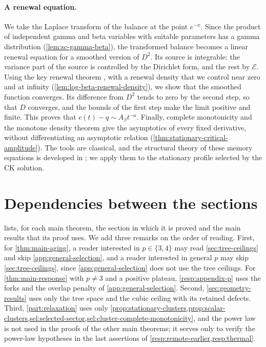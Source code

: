 \paragraph{A renewal equation.}
We take the Laplace transform of the balance at the point $e^{-x}$. Since the product of independent gamma and beta variables with suitable parameters has a gamma distribution (\cref{lem:sc-gamma-beta}), the transformed balance becomes a linear renewal equation for a smoothed version of $D^2$. Its source is integrable: the variance part of the source is controlled by the Dirichlet form, and the rest by $\mathcal E$. Using the key renewal theorem \cite[Chapter~XI, Section~1]{feller1971}, with a renewal density that we control near zero and at infinity (\cref{lem:log-beta-renewal-density}), we show that the smoothed function converges. Its difference from $D^2$ tends to zero by the second step, so that $D$ converges, and the bounds of the first step make the limit positive and finite. This proves that $c(t)-q\sim A_\beta t^{-a}$. Finally, complete monotonicity and the monotone density theorem \cite[Section~1.7.3]{bgt1987} give the asymptotics of every fixed derivative, without differentiating an asymptotic relation (\cref{thm:stationary-critical-amplitude}). The tools are classical, and the structural theory of these memory equations is developed in \cite{gs1995,fv2002,sjogren2003}; we apply them to the stationary profile selected by the CK solution.

\section{Dependencies between the sections}\label{sec:overview-dependencies}

 lists, for each main theorem, the section in which it is proved and the main results that its proof uses. We add three remarks on the order of reading. First, for \cref{thm:main-aging}, a reader interested in $p\in\{3,4\}$ may read \cref{sec:tree-ceilings} and skip \cref{app:general-selection}, and a reader interested in general $p$ may skip \cref{sec:tree-ceilings}, since \cref{app:general-selection} does not use the tree ceilings. For \cref{thm:main-response} with $p\ne3$ and a positive plateau, \cref{resp:appendix-p} uses the forks and the overlap penalty of \cref{app:general-selection}. Second, \cref{sec:geometry-results} uses only the tree space and the cubic ceiling with its retained defects. Third, \cref{part:relaxation} uses only \cref{prop:stationary-clusters,prop:scalar-clusters,sel:selected-sector,sel:cluster-complete-monotonicity}, and the power law is not used in the proofs of the other main theorems; it serves only to verify the power-law hypotheses in the last assertions of \cref{resp:remote-earlier,resp:thermal}.

